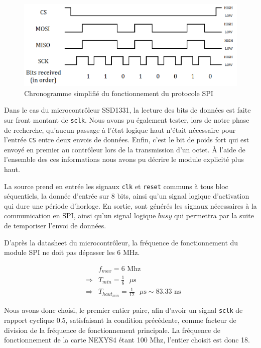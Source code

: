 \documentclass[11pt]{article}
\begin{document}
\begin{figure}[H]
\begin{center}
\includegraphics[scale = 0.32, keepaspectratio]{spi_signals.png}
\caption{Chronogramme simplifié du fonctionnement du protocole SPI \cite{spiimg}}
\end{center}
\end{figure}

Dans le cas du microcontrôleur SSD1331, la lecture des bits de données est faite sur front montant de \texttt{sclk}. Nous avons pu également tester, lors de notre phase de recherche, qu'aucun passage à l'état logique haut n'était nécessaire pour l'entrée \texttt{CS} entre deux envois de données. Enfin, c'est le bit de poids fort qui est envoyé en premier au contrôleur lors de la transmission d'un octet. À l'aide de l'ensemble des ces informations nous avons pu décrire le module explicité plus haut.

La source prend en entrée les signaux \texttt{clk} et \texttt{reset} communs à tous bloc séquentiels, la donnée d'entrée sur 8 bits, ainsi qu'un signal logique d'activation qui dure une période d'horloge. En sortie, sont générés les signaux nécessaires à la communication en SPI, ainsi qu'un signal logique $busy$ qui permettra par la suite de temporiser l'envoi de données.

D'après la datasheet du microcontrôleur, la fréquence de fonctionnement du module SPI ne doit pas dépasser les 6 MHz.

\begin{eqnarray*}
&&f_{max} = 6\text{ Mhz}\\
&\Rightarrow&T_{min} = \frac{1}{6}\text{ }\mu\text{s}\\
&\Rightarrow&T_{haut_{min}} = \frac{1}{12}\text{ }\mu\text{s} \sim 83.33\text{ ns}
\end{eqnarray*}

Nous avons donc choisi, le premier entier paire, afin d'avoir un signal \texttt{sclk} de rapport cyclique 0.5, satisfaisant la condition précédente, comme facteur de division de la fréquence de fonctionnement principale. La fréquence de fonctionnement de la carte NEXYS4 étant 100 Mhz, l'entier choisit est donc 18.
\end{document}
